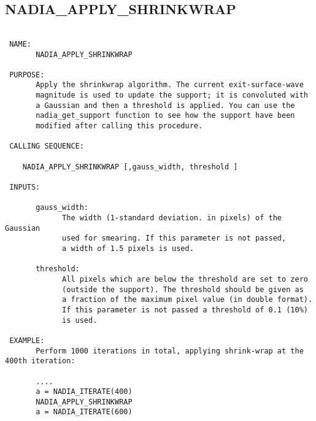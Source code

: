   
 
\subsection{NADIA\_APPLY\_SHRINKWRAP}
\begin{verbatim}

 NAME:
       NADIA_APPLY_SHRINKWRAP

 PURPOSE:
       Apply the shrinkwrap algorithm. The current exit-surface-wave
       magnitude is used to update the support; it is convoluted with
       a Gaussian and then a threshold is applied. You can use the
       nadia_get_support function to see how the support have been
       modified after calling this procedure.

 CALLING SEQUENCE:

	NADIA_APPLY_SHRINKWRAP [,gauss_width, threshold ]

 INPUTS:

       gauss_width: 
             The width (1-standard deviation. in pixels) of the Gaussian
             used for smearing. If this parameter is not passed, 
             a width of 1.5 pixels is used.

       threshold:
             All pixels which are below the threshold are set to zero 
             (outside the support). The threshold should be given as
             a fraction of the maximum pixel value (in double format). 
             If this parameter is not passed a threshold of 0.1 (10%)
             is used.

 EXAMPLE:
       Perform 1000 iterations in total, applying shrink-wrap at the 400th iteration:

       ....
       a = NADIA_ITERATE(400)
       NADIA_APPLY_SHRINKWRAP
       a = NADIA_ITERATE(600)

\end{verbatim}


